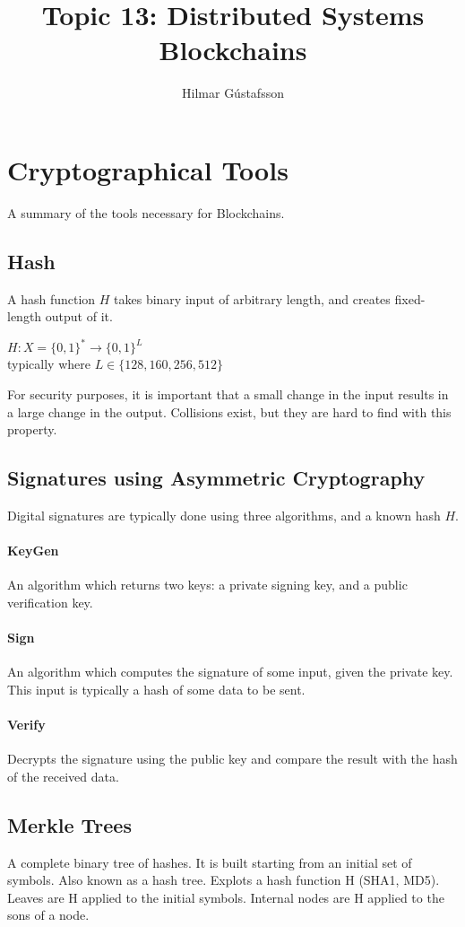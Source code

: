 \documentclass[twocolumn]{article}
\title{Topic 13: Distributed Systems \\ \Large{Blockchains}}
\author{Hilmar G\'ustafsson}
\begin{document}
\maketitle

\section{Cryptographical Tools}
A summary of the tools necessary for Blockchains.

\subsection{Hash}
A hash function $H$ takes binary input of arbitrary length, and creates fixed-length output of it.
\begin{center}
 $H: X = \{0,1\}^* \rightarrow \{0,1\}^L$ \\ typically where $L \in \{128, 160, 256, 512\}$
\end{center}

For security purposes, it is important that a small change in the input results in a large change in the output.
Collisions exist, but they are hard to find with this property.

\subsection{Signatures using Asymmetric Cryptography}
Digital signatures are typically done using three algorithms, and a known hash $H$.

\paragraph{KeyGen} An algorithm which returns two keys: a private signing key, and a public verification key.

\paragraph{Sign} An algorithm which computes the signature of some input, given the private key.
This input is typically a hash of some data to be sent.

\paragraph{Verify} Decrypts the signature using the public key and compare the result with the hash of the received data.

\subsection{Merkle Trees}
A complete binary tree of hashes.
It is built starting from an initial set of symbols.
Also known as a hash tree.
Explots a hash function H (SHA1, MD5).
Leaves are H applied to the initial symbols.
Internal nodes are H applied to the sons of a node.
\end{document}
